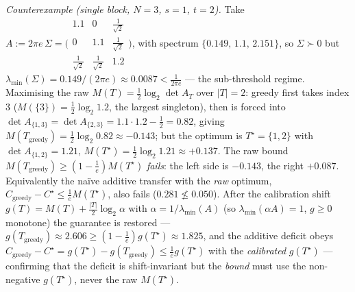 \documentclass[
]{article}
\begin{document}
\emph{Counterexample (single block, $N=3$, $s=1$, $t=2$).} Take
$A:=2\pi e\,\Sigma=\bigl(\begin{smallmatrix}1.1&0&\frac1{\sqrt2}\\
0&1.1&\frac1{\sqrt2}\\ \frac1{\sqrt2}&\frac1{\sqrt2}&1.2\end{smallmatrix}\bigr)$,
with spectrum $\{0.149,\,1.1,\,2.151\}$, so $\Sigma\succ0$ but
$\lambda_{\min}(\Sigma)=0.149/(2\pi e)\approx0.0087<\tfrac1{2\pi e}$ --- the
sub-threshold regime. Maximising the raw $M(T)=\tfrac12\log_2\det A_T$ over
$|T|=2$: greedy first takes index $3$ ($M(\{3\})=\tfrac12\log_2 1.2$, the
largest singleton), then is forced into $\det A_{\{1,3\}}=\det A_{\{2,3\}}=
1.1\cdot1.2-\tfrac12=0.82$, giving $M(T_{\mathrm{greedy}})=\tfrac12\log_2
0.82\approx-0.143$; but the optimum is $T^\star=\{1,2\}$ with $\det A_{\{1,2\}}=
1.21$, $M(T^\star)=\tfrac12\log_2 1.21\approx+0.137$. The raw bound
$M(T_{\mathrm{greedy}})\ge(1-\tfrac1e)M(T^\star)$ \emph{fails}: the left side is
$-0.143$, the right $+0.087$. Equivalently the na\"ive additive transfer with
the \emph{raw} optimum, $C_{\mathrm{greedy}}-C^\star\le\tfrac1e M(T^\star)$,
also fails ($0.281\not\le0.050$). After the calibration shift $g(T)=M(T)+\tfrac{|T|}2
\log_2\alpha$ with $\alpha=1/\lambda_{\min}(A)$ (so $\lambda_{\min}(\alpha A)=1$,
$g\ge0$ monotone) the guarantee is restored --- $g(T_{\mathrm{greedy}})\approx
2.606\ge(1-\tfrac1e)g(T^\star)\approx1.825$, and the additive deficit obeys
$C_{\mathrm{greedy}}-C^\star=g(T^\star)-g(T_{\mathrm{greedy}})\le\tfrac1e
g(T^\star)$ with the \emph{calibrated} $g(T^\star)$ --- confirming that the
deficit is shift-invariant but the \emph{bound} must use the non-negative
$g(T^\star)$, never the raw $M(T^\star)$.
\end{document}
